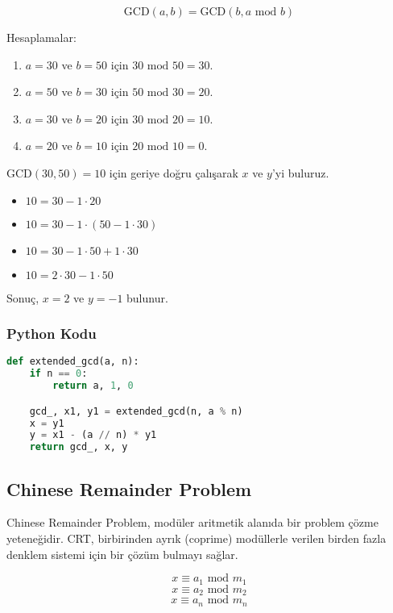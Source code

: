 \[ \text{GCD}(a, b) = \text{GCD}(b, a \text{ mod } b) \]

Hesaplamalar:

\begin{enumerate}
    \item $a = 30$ ve $b = 50$ için $30 \text{ mod } 50 = 30$.
    \item $a = 50$ ve $b = 30$ için $50 \text{ mod } 30 = 20$.
    \item $a = 30$ ve $b = 20$ için $30 \text{ mod } 20 = 10$.
    \item $a = 20$ ve $b = 10$ için $20 \text{ mod } 10 = 0 $.
\end{enumerate}

$\text{GCD}(30, 50) = 10$ için geriye doğru çalışarak $x$ ve $y$'yi buluruz.

\begin{itemize}
    \item $10 = 30 - 1 \cdot 20$
    \item $10 = 30 - 1 \cdot (50 - 1 \cdot 30)$
    \item $10 = 30 - 1 \cdot 50 + 1 \cdot 30$
    \item $10 = 2 \cdot 30 - 1 \cdot 50$
\end{itemize}

Sonuç, $x = 2$ ve $y = -1$ bulunur.

\subsubsection{Python Kodu}

\begin{lstlisting}[language=Python]
def extended_gcd(a, n):
    if n == 0:
        return a, 1, 0

    gcd_, x1, y1 = extended_gcd(n, a % n)
    x = y1
    y = x1 - (a // n) * y1
    return gcd_, x, y
\end{lstlisting}

\newpage

\subsection{Chinese Remainder Problem}

Chinese Remainder Problem, modüler aritmetik alanıda bir problem çözme yeteneğidir. CRT, birbirinden ayrık (coprime) modüllerle verilen birden fazla denklem sistemi için bir çözüm bulmayı sağlar.

\[ x \equiv a_1 \text{ mod } m_1 \]
\[ x \equiv a_2 \text{ mod } m_2 \]
\[ x \equiv a_n \text{ mod } m_n \]

